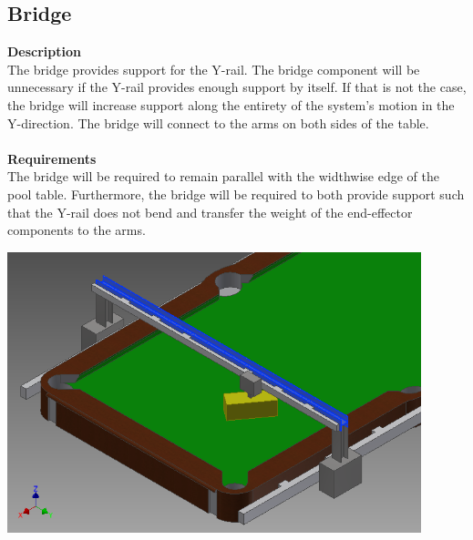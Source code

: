 \documentclass[titlepage]{article}
\begin{document}
\subsection{Bridge}
\textbf{Description}\\
The bridge provides support for the Y-rail. The bridge component will be unnecessary if the Y-rail provides enough support by itself. If that is not the case, the bridge will increase support along the entirety of the system's motion in the Y-direction. The bridge will connect to the arms on both sides of the table.\\\\
\textbf{Requirements}\\
The bridge will be required to remain parallel with the widthwise edge of the pool table. Furthermore, the bridge will be required to both provide support such that the Y-rail does not bend and transfer the weight of the end-effector components to the arms.
\begin{center}
	\includegraphics[width = 0.9\textwidth]{bridge.png}
\label{fig:bridgeFig}
\end{center}

\newpage
\end{document}
